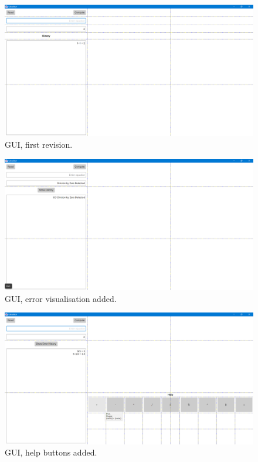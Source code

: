 \documentclass[a4paper, oneside, 11pt]{report}
\begin{document}
    \begin{figure}[htb]
        \begin{center}
            \includegraphics[width=0.9 \columnwidth]{gui_old_01.png}
            \caption{GUI, first revision.}
            \label{gui01}
        \end{center}
    \end{figure}

    \begin{figure}[htb]
        \begin{center}
            \includegraphics[width=0.9 \columnwidth]{gui_old_02.png}
            \caption{GUI, error visualisation added.}
            \label{gui02}
        \end{center}
    \end{figure}

    \begin{figure}[htb]
        \begin{center}
            \includegraphics[width=0.9 \columnwidth]{gui_old_03.png}
            \caption{GUI, help buttons added.}
            \label{gui03}
        \end{center}
    \end{figure}
\end{document}
